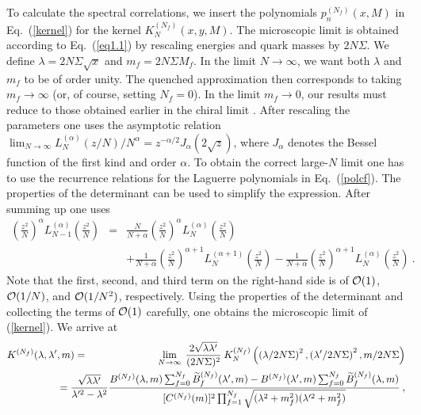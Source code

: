 To calculate the spectral correlations, we insert the polynomials
$p_n^{(N_f)}(x,M)$ in Eq.~(\ref{kernel}) for the kernel
$K_N^{(N_f)}(x,y,M)$.  The microscopic limit is obtained according to
Eq.~(\ref{eq1.1}) by rescaling energies and quark masses by
$2N\Sigma$.  We define $\lambda=2N\Sigma \sqrt{x}$ and $m_f=2N\Sigma
M_f$.  In the limit $N\to\infty$, we want both $\lambda$ and $m_f$ to
be of order unity.  The quenched approximation then corresponds to
taking $m_f\to\infty$ (or, of course, setting $N_f=0$).  In the limit
$m_f\to 0$, our results must reduce to those obtained earlier in the
chiral limit \cite{Verb93}.  After rescaling the parameters one uses
the asymptotic relation $\lim_{N\to\infty}L_N^{(\alpha)}(z/N)/N^\alpha
= z^{-\alpha/2}J_\alpha(2\sqrt{z})$, where $J_\alpha$ denotes the
Bessel function of the first kind and order $\alpha$. To obtain the
correct large-$N$ limit one has to use the recurrence relations for
the Laguerre polynomials \cite{Grad65} in Eq.~(\ref{polcf}).  The
properties of the determinant can be used to simplify the expression.
After summing up one uses
\begin{eqnarray}
{\left(\frac{z^2}{N}\right)^\alpha}
        L_{N-1}^{(\alpha)}{\left(\frac{z^2}{N}\right)}&=&
{\frac{N}{N+\alpha}\left(\frac{z^2}{N}\right)^\alpha}
        L_N^{(\alpha)}{\left(\frac{z^2}{N}\right)}\nonumber\\
&&+{\frac{1}{N+\alpha}\left(\frac{z^2}{N}\right)^{\alpha+1}}
        L_N^{(\alpha+1)}{\left(\frac{z^2}{N}\right)}
-{\frac{1}{N+\alpha}\left(\frac{z^2}{N}\right)^{\alpha+1}}
        L_N^{(\alpha)}{\left(\frac{z^2}{N}\right)}\:.
\label{reccur}
\end{eqnarray}
Note that the first, second, and third term on the right-hand side is
of ${\cal O}(1)$, ${\cal O}(1/N)$, and ${\cal O}(1/N^2)$,
respectively.  Using the properties of the determinant and collecting
the terms of  ${\cal O}(1)$ carefully, one obtains the
microscopic limit of (\ref{kernel}).  We arrive at
\begin{eqnarray}
K^{(N_f)}(\lambda,\lambda^\prime,m) & = &\lim\limits_{N\to\infty}
 \:\frac{2\sqrt{\lambda\lambda^\prime}}{(2N\Sigma)^2}\:
  K_N^{(N_f)}\left(\left(\lambda/2N\Sigma\right)^2,
    \left(\lambda^\prime/2N\Sigma\right)^2,
    m/2N\Sigma\right)
  \nonumber \\ & & \hspace*{-35pt} = 
  \frac{\sqrt{\lambda\lambda^\prime}}{\lambda^{\prime 2}-\lambda^2}
  \frac{B^{(N_f)}(\lambda,m)\sum_{f=0}^{N_f}
  \widetilde{B}_f^{(N_f)}(\lambda^\prime,m)
  -B^{(N_f)}(\lambda^\prime,m)\sum_{f=0}^{N_f}
  \widetilde{B}_f^{(N_f)}(\lambda,m)}
  {[C^{(N_f)}(m)]^2\prod_{f=1}^{N_f}\sqrt{(\lambda^2+m_f^2)
      (\lambda^{\prime 2}+m_f^2)}}\:,
\label{microkernel}
\end{eqnarray}
